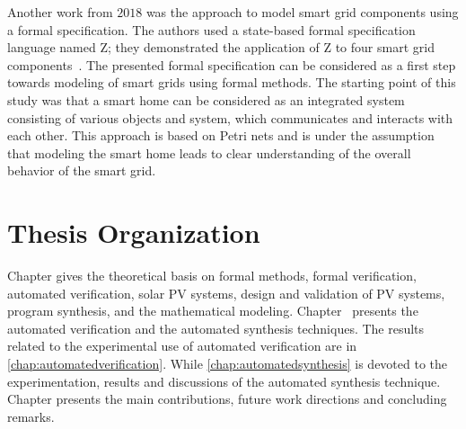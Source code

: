 Another work from $2018$ was the approach to model smart grid components using a formal specification. The authors used a state-based formal specification language named Z; they demonstrated the application of Z to four smart grid components~\cite{Akram2018}. The presented formal specification can be considered as a first step towards modeling of smart grids using formal methods. The starting point of this study was that a smart home can be considered as an integrated system consisting of various objects and system, which communicates and interacts with each other. This approach is based on Petri nets and is under the assumption that modeling the smart home leads to clear understanding of the overall behavior of the smart grid.

\section{Thesis Organization}
Chapter  gives the theoretical basis on formal methods, formal verification, automated verification, solar PV systems, design and validation of PV systems, program synthesis, and the mathematical modeling. Chapter~ presents the automated verification  and the automated synthesis techniques. The results related to the experimental use of automated verification are in \autoref{chap:automatedverification}. While \autoref{chap:automatedsynthesis} is devoted to the experimentation, 
results and discussions of the automated synthesis technique. Chapter  presents the main contributions, future work directions and concluding remarks.
